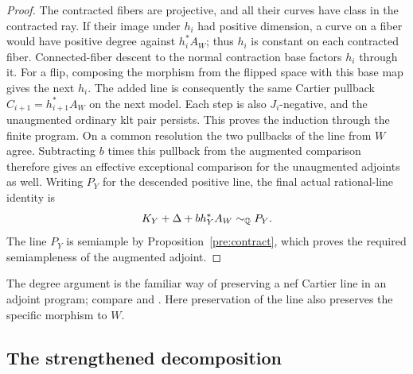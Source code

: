 \begin{proof}
The contracted fibers are projective, and all their curves have class
in the contracted ray. If their image under \(h_i\) had positive
dimension, a curve on a fiber would have positive degree against
\(h_i^*A_W\); thus \(h_i\) is constant on each contracted fiber.
Connected-fiber descent to the normal contraction base factors \(h_i\)
through it. For a flip, composing the morphism from the flipped space
with this base map gives the next \(h_i\). The added line is consequently
the same Cartier pullback \(C_{i+1}=h_{i+1}^*A_W\) on the next model.
Each step is also \(J_i\)-negative, and the unaugmented ordinary klt
pair persists. This proves the induction through the finite program.
On a common resolution the two pullbacks of the line from \(W\)
agree. Subtracting \(b\) times this pullback from the augmented
comparison therefore gives an effective exceptional comparison for
the unaugmented adjoints as well.
Writing \(P_Y\) for the descended positive line, the final actual
rational-line identity is
\[
 K_Y+\Delta+b h_Y^*A_W\sim_{\mathbb Q} P_Y.
\]
The line \(P_Y\) is semiample by Proposition~\ref{pre:contract}, which
proves the required semiampleness of the augmented adjoint.
\end{proof}

The degree argument is the familiar way of preserving a nef Cartier
line in an adjoint program; compare \cite[Lemma~3.6]{K} and
\cite[Section~8.2]{P}. Here preservation of the line also preserves the
specific morphism to \(W\).

\subsection{The strengthened decomposition}

